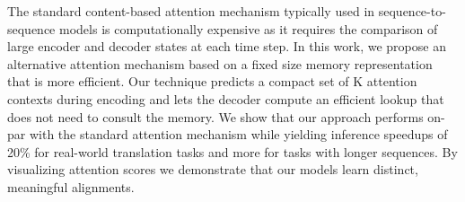The standard content-based attention mechanism typically used in sequence-to-sequence models is computationally expensive as it requires the comparison of large encoder and decoder states at each time step. In this work, we propose an alternative attention mechanism based on a fixed size memory representation that is more efficient. Our technique predicts a compact set of K attention contexts during encoding and lets the decoder compute an efficient lookup that does not need to consult the memory. We show that our approach performs on-par with the standard attention mechanism while yielding inference speedups of 20\% for real-world translation tasks and more for tasks with longer sequences. By visualizing attention scores we demonstrate that our models learn distinct, meaningful alignments.
